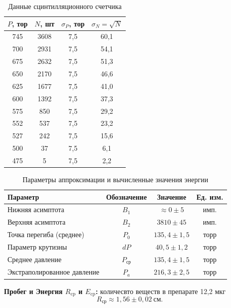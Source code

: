 \documentclass[a4paper]{article}
\begin{document}
\begin{table}[h]
\centering
\caption{Данные сцинтилляционного счетчика}
\begin{tabular}{|c|c|c|c|}
\hline
\textbf{$P$, тор} & \textbf{$N$, шт} & \textbf{$\sigma_P$, тор} & \textbf{$\sigma_N = \sqrt{N}$} \\
\hline
745  & 3608 & 7{,}5 & 60{,}1 \\
700  & 2931 & 7{,}5 & 54{,}1 \\
675  & 2632 & 7{,}5 & 51{,}3 \\
650  & 2170 & 7{,}5 & 46{,}6 \\
625  & 1677 & 7{,}5 & 41{,}0 \\
600  & 1392 & 7{,}5 & 37{,}3 \\
575  & 850  & 7{,}5 & 29{,}2 \\
552  & 537  & 7{,}5 & 23{,}2 \\
527  & 242  & 7{,}5 & 15{,}6 \\
500  & 37   & 7{,}5 & 6{,}1  \\
475  & 5    & 7{,}5 & 2{,}2  \\
\hline
\end{tabular}
\end{table}


\begin{table}[h]
\centering
\caption{Параметры аппроксимации и вычисленные значения энергии}
\begin{tabular}{|l|c|c|c|}
\hline
\textbf{Параметр} & \textbf{Обозначение} & \textbf{Значение} & \textbf{Ед. изм.} \\
\hline
Нижняя асимптота              & $B_1$   & $\approx 0 \pm 5$       & имп.   \\
Верхняя асимптота             & $B_2$   & $3810 \pm 45$           & имп.   \\
Точка перегиба (среднее)      & $P_0$   & $135{,}4 \pm 1{,}5$     & торр   \\
Параметр крутизны             & $dP$    & $40{,}5 \pm 1{,}2$      & торр   \\
Среднее давление              & $P_{\text{ср}}$ & $135{,}4 \pm 1{,}5$ & торр \\
Экстраполированное давление   & $P_a$   & $216{,}3 \pm 2{,}5$     & торр   \\
\hline
\end{tabular}
\end{table}

\textbf{Пробег и Энергия $R_{\text{cp}}$ и $E_{\text{cp}}$:} количесвто веществ в препарате 12,2 мкг 
\[
R_{\mathrm{ср}}  \approx 1{,}56 \pm 0,02 ~\text{см}.
\]
\end{document}
